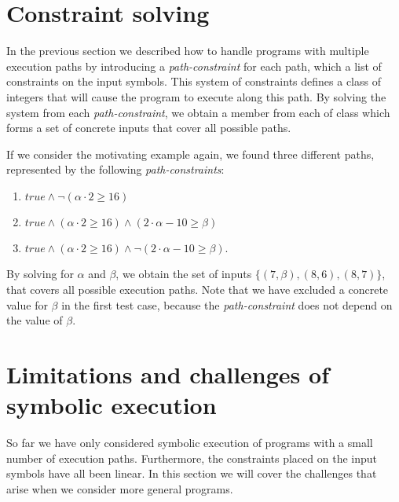 		
\section{Constraint solving}
	
	In the previous section we described how to handle programs with multiple execution paths by introducing a \emph{path-constraint} for each path, which a list of constraints on the input symbols. This system of constraints defines a class of integers that will cause the program to execute along this path. By solving the system from each \emph{path-constraint}, we obtain a member from each of class which forms a set of concrete inputs that cover all possible paths.    
	
	If we consider the motivating example again, we found three different paths, represented by the following \emph{path-constraints}:
	\begin{enumerate}
		\item $true \land \neg (\alpha \cdot 2 \geq 16)$
		\item $true \land (\alpha \cdot 2 \geq 16) \land (2\cdot \alpha - 10 \geq \beta)$
		\item $true \land (\alpha \cdot 2 \geq 16) \land \neg (2\cdot \alpha - 10 \geq \beta)$.
	\end{enumerate}
	
	By solving for $\alpha$ and $\beta$, we obtain the set of inputs $\{(7, \beta), (8,6), (8, 7)\}$, that covers all possible execution paths. Note that we have excluded a concrete value for $\beta$ in the first test case, because the \emph{path-constraint} does not depend on the value of $\beta$. 
	 
\section{Limitations and challenges of symbolic execution}
	So far we have only considered symbolic execution of programs with a small number of execution paths. Furthermore, the constraints placed on the input symbols have all been linear.
	In this section we will cover the challenges that arise when we consider more general programs.
	
